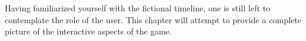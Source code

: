 
Having familiarized yourself with the fictional timeline, one is still left to contemplate the role of the user. This chapter will attempt to provide a complete picture of the interactive aspects of the game.

%

\StopChapter


